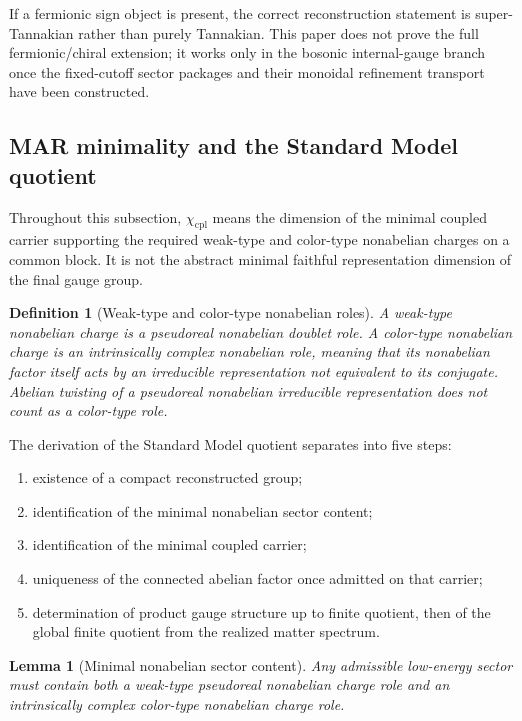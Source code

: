 \documentclass[11pt]{article}
\newtheorem{lemma}[theorem]{Lemma}
\newtheorem{definition}[theorem]{Definition}
\begin{document}
If a fermionic sign object is present, the correct reconstruction statement is super-Tannakian
rather than purely Tannakian. This paper does not prove the full fermionic/chiral extension; it
works only in the bosonic internal-gauge branch once the fixed-cutoff sector packages and their
monoidal refinement transport have been constructed.

\subsection{MAR minimality and the Standard Model quotient}

Throughout this subsection, $\chi_{\mathrm{cpl}}$ means the dimension of the minimal coupled carrier supporting the required weak-type and color-type nonabelian charges on a common block. It is not the abstract minimal faithful representation dimension of the final gauge group.

\begin{definition}[Weak-type and color-type nonabelian roles]
A weak-type nonabelian charge is a pseudoreal nonabelian doublet role. A color-type nonabelian charge is an intrinsically complex nonabelian role, meaning that its nonabelian factor itself acts by an irreducible representation not equivalent to its conjugate. Abelian twisting of a pseudoreal nonabelian irreducible representation does not count as a color-type role.
\end{definition}

The derivation of the Standard Model quotient separates into five steps:
\begin{enumerate}[leftmargin=2em]
\item existence of a compact reconstructed group;
\item identification of the minimal nonabelian sector content;
\item identification of the minimal coupled carrier;
\item uniqueness of the connected abelian factor once admitted on that carrier;
\item determination of product gauge structure up to finite quotient, then of the global finite quotient from the realized matter spectrum.
\end{enumerate}

\begin{lemma}[Minimal nonabelian sector content]\label{lem:mincontent}
Any admissible low-energy sector must contain both a weak-type pseudoreal nonabelian charge role and an intrinsically complex color-type nonabelian charge role.
\end{lemma}
\end{document}
